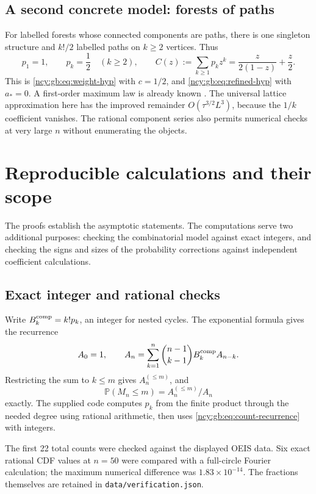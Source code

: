 \documentclass[11pt,letterpaper]{article}
\numberwithin{equation}{section}
\theoremstyle{remark}\newtheorem{remark}[theorem]{Remark}
\theoremstyle{definition}\newtheorem{definition}[theorem]{Definition}\theoremstyle{plain}
\newcommand{\Pbb}{\mathbb P}
\begin{document}
\subsection{A second concrete model: forests of paths}

For labelled forests whose connected components are paths,
there is one singleton structure and \(k!/2\) labelled paths on
\(k\ge2\) vertices. Thus
\[
 p_1=1,\qquad p_k=\frac12\quad(k\ge2),\qquad
 C(z):=\sum_{k\ge1}p_kz^k
 =\frac{z}{2(1-z)}+\frac z2.
\]
This is \eqref{ncy:gb:eq:weight-hyp} with \(c=1/2\), and
\eqref{ncy:gb:eq:refined-hyp} with \(a_*=0\). A first-order maximum
law is already known \cite{BMWconf,BMW}.
The universal lattice approximation here has the improved
remainder \(O(\tau^{3/2}L^3)\), because the \(1/k\) coefficient
vanishes. The rational component series also permits numerical
checks at very large \(n\) without enumerating the objects.

\section{Reproducible calculations and their scope}\label{ncy:gb:sec:computation}

The proofs establish the asymptotic statements. The computations
serve two additional purposes: checking the combinatorial model
against exact integers, and checking the signs and sizes of the
probability corrections against independent coefficient calculations.

\subsection{Exact integer and rational checks}

Write \(B_k^{\rm comp}=k!p_k\), an integer for nested cycles.
The exponential formula gives the recurrence
\begin{equation}\label{ncy:gb:eq:count-recurrence}
 A_0=1,\qquad
 A_n=\sum_{k=1}^n\binom{n-1}{k-1}B_k^{\rm comp}A_{n-k}.
\end{equation}
Restricting the sum to \(k\le m\) gives \(A_n^{(\le m)}\), and
\[
 \Pbb(M_n\le m)=A_n^{(\le m)}/A_n
\]
exactly. The supplied code computes \(p_k\) from the finite
product through the needed degree using rational arithmetic,
then uses \eqref{ncy:gb:eq:count-recurrence} with integers.

The first 22 total counts were checked against the displayed
OEIS data. Six exact rational CDF values at \(n=50\) were compared
with a full-circle Fourier calculation; the maximum numerical
difference was \(1.83\times10^{-14}\).
The fractions themselves are retained in
\texttt{data/verification.json}.
\end{document}
